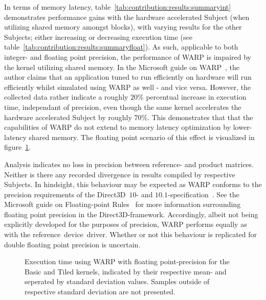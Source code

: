 In terms of memory latency, table~\ref{tab:contribution:results:summaryint} demonstrates performance gains with the hardware accelerated Subject (when utilizing shared memory amongst blocks), with varying results for the other Subjects; either increasing or decreasing execution time (see table~\ref{tab:contribution:results:summaryfloat}).
As such, applicable to both integer- and floating point precision, the performance of WARP is impaired by the kernel utilizing shared memory.
In the Microsoft guide on WARP~, the author claims that an application tuned to run efficiently on hardware will run efficiently whilst simulated using WARP as well - and vice versa.
However, the collected data rather indicate a roughly $20\%$ percentual increase in execution time, independant of precision, even though the same kernel accelerates the hardware accelerated Subject by roughly $70$\%.
This demonstrates that that the capabilities of WARP do not extend to memory latency optimization by lower-latency shared memory.
The floating point scenario of this effect is visualized in figure~\ref{fig:contribution:results:warp:msswarp}.

Analysis indicates no loss in precision between reference- and product matrices.
Neither is there any recorded divergence in results compiled by respective Subjects.
In hindsight, this behaviour may be expected as WARP conforms to the precision requirements of the Direct3D~$10$- and $10.1$-specification~.
See the Microsoft guide on Floating-point Rules~ for more information surrounding floating point precision in the Direct3D-framework.
Accordingly, albeit not being explicitly developed for the purposes of precision, WARP performs equally as with the reference~device~driver.
Whether or not this behaviour is replicated for double floating point precision is uncertain.

\begin{figure}[htb]
\begin{center}
	\resizebox{ \columnwidth }{!}{}
	\caption{Execution time using WARP with floating point-precision for the Basic and Tiled kernels, indicated by their respective mean- and seperated by standard deviation values. Samples outside of respective standard deviation are not presented.}
	\label{fig:contribution:results:warp:msswarp}
\end{center}
\end{figure}
